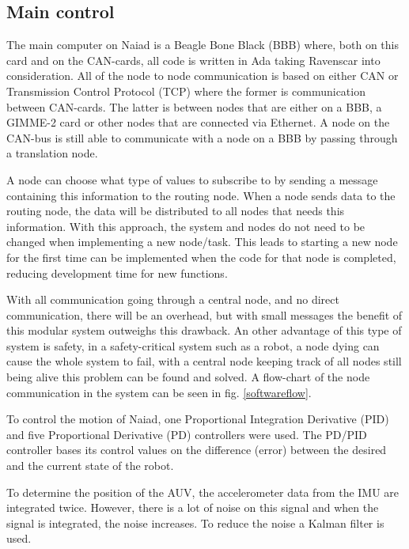 \documentclass[twoside,12pt]{article}
\begin{document}
\begin{multicols*}{2}
\subsection{Main control}
The main computer on Naiad is a Beagle Bone Black (BBB) where, both on this card and on the CAN-cards, all code is written in Ada taking Ravenscar into consideration. All of the node to node communication is based on either CAN or Transmission Control Protocol (TCP) where the former is communication between CAN-cards. The latter is between nodes that are either on a BBB, a GIMME-2 card or other nodes that are connected via Ethernet. A node on the CAN-bus is still able to communicate with a node on a BBB by passing through a translation node.

A node can choose what type of values to subscribe to by sending a message containing this information to the routing node. When a node sends data to the routing node, the data will be distributed to all nodes that needs this information. With this approach, the system and nodes do not need to be changed when implementing a new node/task. This leads to starting a new node for the first time can be implemented when the code for that node is completed, reducing development time for new functions.

With all communication going through a central node, and no direct communication, there will be an overhead, but with small messages the benefit of this modular system outweighs this drawback. An other advantage of this type of system is safety, in a safety-critical system such as a robot, a node dying can cause the whole system to fail, with a central node keeping track of all nodes still being alive this problem can be found and solved. A flow-chart of the node communication in the system can be seen in fig. \ref{softwareflow}.

To control the motion of Naiad, one Proportional Integration Derivative (PID) and five Proportional Derivative (PD) controllers were used. The PD/PID controller bases its control values on the difference (error) between the desired and the current state of the robot. 

To determine the position of the AUV, the accelerometer data from the IMU are integrated twice. However, there is a lot of noise on this signal and when the signal is integrated, the noise increases. To reduce the noise a Kalman filter is used. 


\end{multicols*}
\end{document}

